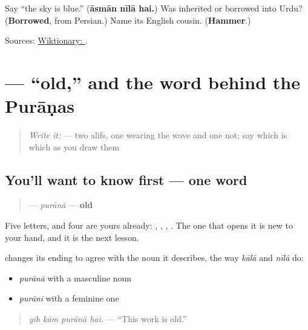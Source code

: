 \begin{tcolorbox}[breakable,colback=teal!4,colframe=teal!35!black,title={Before you move on}]
Say \textquotedblleft{}the sky is blue.\textquotedblright{} (\textbf{āsmān nīlā hai.}) Was \textbf{} inherited or borrowed into Urdu? (\textbf{Borrowed}, from Persian.) Name its English cousin. (\textbf{Hammer}.)

Sources: \href{https://en.wiktionary.org/wiki/\%D8\%A2\%D8\%B3\%D9\%85\%D8\%A7\%D9\%86}{Wiktionary: }.
\end{tcolorbox}
\section[\texorpdfstring{\ur{پرانا} (purānā)}{پرانا (purānā)}]{ — \textquotedblleft{}old,\textquotedblright{} and the word behind the Purāṇas}

\label{lesson:UR-C18-purana}



\begin{quote}
\emph{Write it:}  — two alifs, one wearing the wave and one not; say which is which as you draw them
\end{quote}

\subsection*{You'll want to know first — one word}
\begin{quote}
\textbf{} — \emph{purānā} — \textbf{old}
\end{quote}

Five letters, and four are yours already: \textbf{}, \textbf{}, \textbf{}, \textbf{}. The one that opens it is new to your hand, and it is the next lesson.

\textbf{} changes its ending to agree with the noun it describes, the way \textbf{} \emph{kālā} and \textbf{} \emph{nīlā} do:

\begin{itemize}
\raggedright
  \item \textbf{} \emph{purānā} with a masculine noun
  \item \textbf{} \emph{purānī} with a feminine one
\end{itemize}

\begin{quote}
\emph{yih kām purānā hai.} — \textquotedblleft{}This work is old.\textquotedblright{}
\end{quote}

